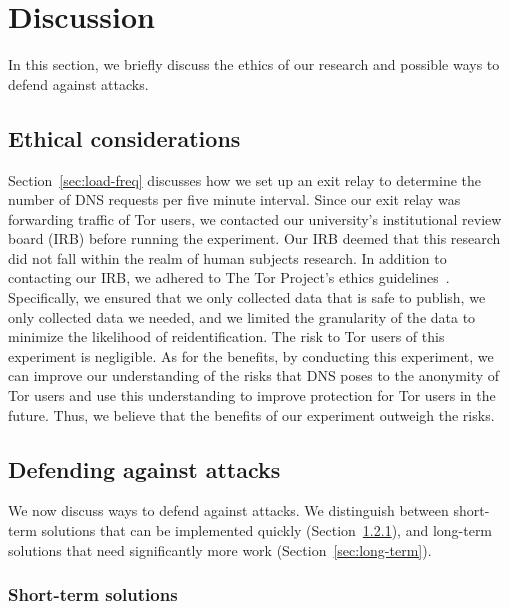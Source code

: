 \section{Discussion}
\label{sec:discussion}

In this section, we briefly discuss the ethics of our research and
possible ways to defend against \name attacks.

\subsection{Ethical considerations}
\label{sec:ethics}

Section~\ref{sec:load-freq} discusses how we set up an exit relay to
determine the number of DNS requests per five minute interval.  Since
our exit relay was forwarding traffic of Tor users, we contacted our
university's institutional review board (IRB) before running the
experiment.  Our IRB deemed that this research did not fall within the
realm of human subjects research.  In addition to contacting our IRB, we
adhered to The Tor Project's ethics guidelines~\cite{ethics-guidelines}.
Specifically, \first we ensured that we only collected data that is safe
to publish, \second we only collected data we needed, and \third we
limited the granularity of the data to minimize the likelihood of
reidentification.  The risk to Tor users of this experiment is negligible.
As for the benefits, by conducting this experiment, we can improve our
understanding of the risks that DNS poses to the anonymity of Tor users
and use this understanding to improve protection for Tor users in the
future.
Thus, we believe that the benefits of our experiment outweigh the risks.

\subsection{Defending against \name attacks}

We now discuss ways to defend against \name attacks.  We distinguish
between short-term solutions that can be implemented quickly
(Section~\ref{sec:short-term}), and long-term solutions that need significantly
more work (Section~\ref{sec:long-term}).

\subsubsection{Short-term solutions}
\label{sec:short-term}

